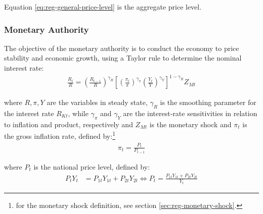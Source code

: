 \documentclass[../thesis.tex]{subfiles}
\begin{document}
Equation \ref{eq:reg-general-price-level} is the aggregate price level.


\subsubsection{Monetary Authority}

The objective of the monetary authority is to conduct the economy to price stability and economic growth, using a Taylor rule \cite{taylor_discretion_1993} to determine the nominal interest rate:
\begin{align}
	\label{eq:reg-monetary-policy}
	\frac{R_{t}}{R} =
	\left( \frac{R_{t-1}}{R} \right)^{\gamma_R}  \left[
	\left( \frac{\pi_t}{\pi} \right)^{\gamma_\pi}
	\left( \frac{Y_{t}}{Y} \right)^{\gamma_Y} \right]^{1-\gamma_R} Z_{Mt}
\end{align}

where $R, \pi, Y$ are the variables in steady state, $\gamma_R$ is the smoothing parameter for the interest rate $R_{Kt}$, while $\gamma_\pi$ and $\gamma_Y$ are the interest-rate sensitivities in relation to inflation and product, respectively and $Z_{Mt}$ is the monetary shock and $\pi_t$ is the gross inflation rate, defined by:\footnote{for the monetary shock definition, see section \ref{sec:reg-monetary-shock}.}
\begin{align}
	\pi_t = \frac{P_t}{P_{t-1}}
	\label{eq:reg-gross-inflation-rate}
\end{align}

where $P_t$ is the national price level, defined by:
\begin{align}
	P_{t} Y_{t} &= P_{1t} Y_{1t} + P_{2t} Y_{2t} \iff P_{t} = \frac{P_{1t} Y_{1t} + P_{2t} Y_{2t}}{Y_{t}} \label{eq:national-price-level}
\end{align}

\begin{comment}
	\begin{align}
		P_{t} Y_{t} &= P_{1t} Y_{1t} + P_{2t} Y_{2t} \implies \nonumber \\
		P_{t} &= \frac{Y_{1t}}{Y_{t}} P_{1t} + \frac{Y_{2t}}{Y_{t}} P_{2t} \implies \nonumber \\
		P_{t} &= \theta_{P1} P_{1t} + (1 -\theta_{P1}) P_{2t} %
	\end{align}
	
	where $\theta_{P1}$ and $(1-\theta_{P1})$ are the price level weights of regions 1 and 2 in the national price level composition, respectively:
	\begin{align}
		\left\langle \begin{matrix} \theta_{P1} & (1-\theta_{P1}) \end{matrix} \right\rangle \coloneq \left\langle \begin{matrix} \frac{Y_{1t}}{Yt} & \frac{Y_{2t}}{Yt} \end{matrix} \right\rangle \label{eq:reg-ss-P1-P2-weight-in-P}
	\end{align}
\end{comment}
\end{document}
